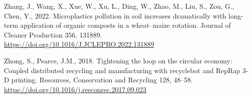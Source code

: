 \documentclass[12pt]{elsarticle} %
\newlength{\cslhangindent}
\newlength{\cslentryspacingunit} %
\newenvironment{CSLReferences}[2] %
 {%
  \setlength{\parindent}{0pt}
  \ifodd #1
  \let\oldpar\par
  \def\par{\hangindent=\cslhangindent\oldpar}
  \fi
  \setlength{\parskip}{#2\cslentryspacingunit}
 }%
 {}
\begin{document}
\begin{CSLReferences}{1}{0}
\leavevmode{}%
Zhang, J., Wang, X., Xue, W., Xu, L., Ding, W., Zhao, M., Liu, S., Zou, G., Chen, Y., 2022. Microplastics pollution in soil increases dramatically with long-term application of organic composts in a wheat--maize rotation. Journal of Cleaner Production 356, 131889. \url{https://doi.org/10.1016/J.JCLEPRO.2022.131889}

\leavevmode{}%
Zhong, S., Pearce, J.M., 2018. Tightening the loop on the circular economy: {Coupled} distributed recycling and manufacturing with recyclebot and {RepRap} 3-{D} printing. Resources, Conservation and Recycling 128, 48--58. \url{https://doi.org/10.1016/j.resconrec.2017.09.023}

\end{CSLReferences}

\newpage

\appendix


\end{document}

